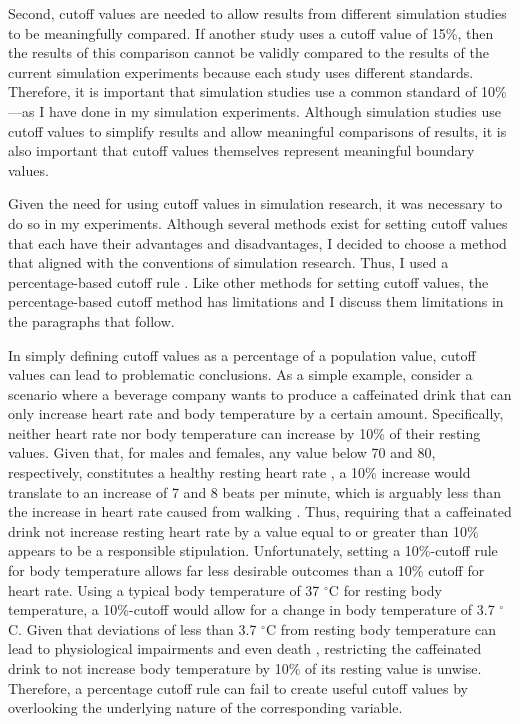\documentclass[
12pt, %
twoside,
english]{guelphthesis}
\begin{document}
Second, cutoff values are needed to allow results from different simulation studies to be meaningfully compared. If another study uses a cutoff value of 15\%, then the results of this comparison cannot be validly compared to
the results of the current simulation experiments because each study uses different standards. Therefore, it is
important that simulation studies use a common standard of 10\% \autocite{muthen1997}---as I have done in my simulation
experiments. Although simulation studies use cutoff values to simplify results and allow meaningful comparisons of results, it is also important that cutoff values themselves represent meaningful boundary values.

Given the need for using cutoff values in simulation research, it was necessary to do so in my experiments. Although several methods exist for setting cutoff values that each have their advantages and disadvantages, I decided to choose a method that aligned with the conventions of simulation research. Thus, I used a percentage-based cutoff rule \autocite{muthen1997}. Like other methods for setting cutoff values, the percentage-based cutoff method has limitations and I discuss them limitations in the paragraphs that follow.

In simply defining cutoff values as a percentage of a population value, cutoff values can lead to problematic conclusions. As a simple example, consider a scenario where a beverage company wants to produce a caffeinated drink that can only increase heart rate and body temperature by a certain amount. Specifically, neither heart rate nor body temperature can increase by 10\% of their resting values. Given that, for males and females, any value below 70 and 80, respectively, constitutes a healthy resting heart rate \autocite{nanchen2018}, a 10\% increase would translate to an increase of 7 and 8 beats per minute, which is arguably less than the increase in heart rate caused from walking \autocite[e.g.,][]{whitley1987}. Thus, requiring that a caffeinated drink not increase resting heart rate by a value equal to or greater than 10\% appears to be a responsible stipulation. Unfortunately, setting a 10\%-cutoff rule for body temperature allows far less desirable outcomes than a 10\% cutoff for heart rate. Using a typical body temperature of 37 \(^\circ\)C for resting body temperature, a 10\%-cutoff would allow for a change in body temperature of 3.7 \(^\circ\)C. Given that deviations of less than 3.7 \(^\circ\)C from resting body temperature can lead to physiological impairments and even death \autocite{moran2002}, restricting the caffeinated drink to not increase body temperature by 10\% of its resting value is unwise. Therefore, a percentage cutoff rule can fail to create useful cutoff values by overlooking the underlying nature of the corresponding variable.
\end{document}
